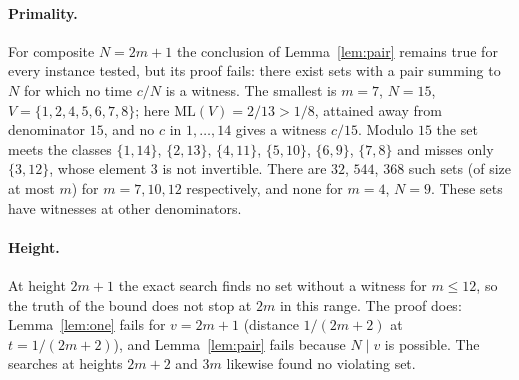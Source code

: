 \documentclass[11pt]{article}
\theoremstyle{remark}
\newcommand{\ML}{\mathrm{ML}}
\begin{document}
\paragraph{Primality.} For composite $N=2m+1$ the conclusion of Lemma~\ref{lem:pair} remains true for every instance tested, but its proof fails: there exist sets with a pair summing to $N$ for which no time $c/N$ is a witness. The smallest is $m=7$, $N=15$, $V=\{1,2,4,5,6,7,8\}$; here $\ML(V)=2/13>1/8$, attained away from denominator $15$, and no $c$ in $1,\dots,14$ gives a witness $c/15$. Modulo $15$ the set meets the classes $\{1,14\}$, $\{2,13\}$, $\{4,11\}$, $\{5,10\}$, $\{6,9\}$, $\{7,8\}$ and misses only $\{3,12\}$, whose element $3$ is not invertible. There are $32$, $544$, $368$ such sets (of size at most $m$) for $m=7,10,12$ respectively, and none for $m=4$, $N=9$. These sets have witnesses at other denominators.

\paragraph{Height.} At height $2m+1$ the exact search finds no set without a witness for $m\le12$, so the truth of the bound does not stop at $2m$ in this range. The proof does: Lemma~\ref{lem:one} fails for $v=2m+1$ (distance $1/(2m+2)$ at $t=1/(2m+2)$), and Lemma~\ref{lem:pair} fails because $N\mid v$ is possible. The searches at heights $2m+2$ and $3m$ likewise found no violating set.
\end{document}
